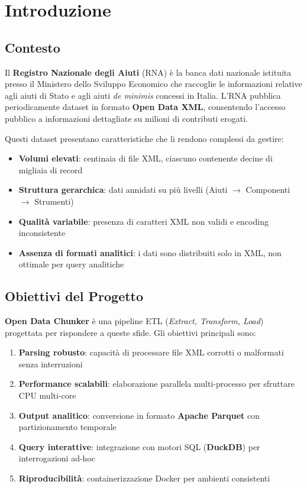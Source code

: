 \chapter{Introduzione}

\section{Contesto}

Il \textbf{Registro Nazionale degli Aiuti} (RNA) è la banca dati nazionale istituita presso il Ministero dello Sviluppo Economico che raccoglie le informazioni relative agli aiuti di Stato e agli aiuti \textit{de minimis} concessi in Italia. L'RNA pubblica periodicamente dataset in formato \textbf{Open Data XML}, consentendo l'accesso pubblico a informazioni dettagliate su milioni di contributi erogati.

Questi dataset presentano caratteristiche che li rendono complessi da gestire:

\begin{itemize}
    \item \textbf{Volumi elevati}: centinaia di file XML, ciascuno contenente decine di migliaia di record
    \item \textbf{Struttura gerarchica}: dati annidati su più livelli (Aiuti $\rightarrow$ Componenti $\rightarrow$ Strumenti)
    \item \textbf{Qualità variabile}: presenza di caratteri XML non validi e encoding inconsistente
    \item \textbf{Assenza di formati analitici}: i dati sono distribuiti solo in XML, non ottimale per query analitiche
\end{itemize}

\section{Obiettivi del Progetto}

\textbf{Open Data Chunker} è una pipeline ETL (\textit{Extract, Transform, Load}) progettata per rispondere a queste sfide. Gli obiettivi principali sono:

\begin{enumerate}
    \item \textbf{Parsing robusto}: capacità di processare file XML corrotti o malformati senza interruzioni
    \item \textbf{Performance scalabili}: elaborazione parallela multi-processo per sfruttare CPU multi-core
    \item \textbf{Output analitico}: conversione in formato \textbf{Apache Parquet} con partizionamento temporale
    \item \textbf{Query interattive}: integrazione con motori SQL (\textbf{DuckDB}) per interrogazioni ad-hoc
    \item \textbf{Riproducibilità}: containerizzazione Docker per ambienti consistenti
\end{enumerate}

